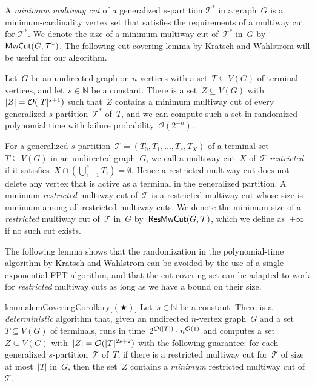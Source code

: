 A \emph{minimum multiway cut} of a generalized $s$-partition $\mathcal{T}^*$ in a graph~$G$ is a minimum-cardinality vertex set that satisfies the requirements of a multiway cut for $\mathcal{T}^*$. We denote the size of a minimum multiway cut of~$\mathcal{T}^*$ in~$G$ by~$\mathsf{MwCut}(G, \mathcal{T}^*)$. The following cut covering lemma by Kratsch and Wahlstr\"{o}m will be useful for our algorithm.

\begin{theorem}\label{thm:multiway-cover}
	Let~$G$ be an undirected graph on $n$ vertices with a set~$T \subseteq V(G)$ of terminal vertices, and let~$s \in \mathbb{N}$ be a constant. There is a set~$Z \subseteq V(G)$ with~$|Z| = \mathcal{O}(|T|^{s+1})$ such that~$Z$ contains a minimum multiway cut of every generalized $s$-partition~$\mathcal{T}^*$ of~$T$, and we can compute such a set in randomized polynomial time with failure probability~$\mathcal{O}(2^{-n})$.
\end{theorem}

For a generalized $s$-partition~$\mathcal{T} = (T_0, T_1, \ldots, T_s, T_X)$ of a terminal set~$T \subseteq V(G)$ in an undirected graph~$G$, we call a multiway cut~$X$ of~$\mathcal{T}$ \emph{restricted} if it satisfies~$X \cap (\bigcup_{i=1}^s T_i) = \emptyset$. Hence a restricted multiway cut does not delete any vertex that is active as a terminal in the generalized partition. A minimum \emph{restricted} multiway cut of~$\mathcal{T}$ is a restricted multiway cut whose size is minimum among all restricted multiway cuts. We denote the minimum size of a \emph{restricted} multiway cut of~$\mathcal{T}$ in~$G$ by~$\mathsf{ResMwCut}(G, \mathcal{T})$, which we define as~$+\infty$ if no such cut exists. 

The following lemma shows that the randomization in the polynomial-time algorithm by Kratsch and Wahlstr\"{o}m can be avoided by the use of a single-exponential FPT algorithm, and that the cut covering set can be adapted to work for \emph{restricted} multiway cuts as long as we have a bound on their size.

\begin{restatable}{lemma}{lemCoveringCorollary}[$(\bigstar)$]
	\label{lem:covering:corollary}
	Let~$s \in \mathbb{N}$ be a constant. There is a \emph{deterministic} algorithm that, given an undirected $n$-vertex graph~$G$ and a set~$T \subseteq V(G)$ of terminals, runs in time~$2^{\mathcal{O}(|T|)} \cdot n^{\mathcal{O}(1)}$ and computes a set~$Z \subseteq V(G)$ with~$|Z| = \mathcal{O}(|T|^{2s+2})$ with the following guarantee: for each generalized $s$-partition~$\mathcal{T}$ of~$T$, if there is a restricted multiway cut for~$\mathcal{T}$ of size at most~$|T|$ in~$G$, then the set~$Z$ contains a \emph{minimum} restricted multiway cut of~$\mathcal{T}$.
\end{restatable}